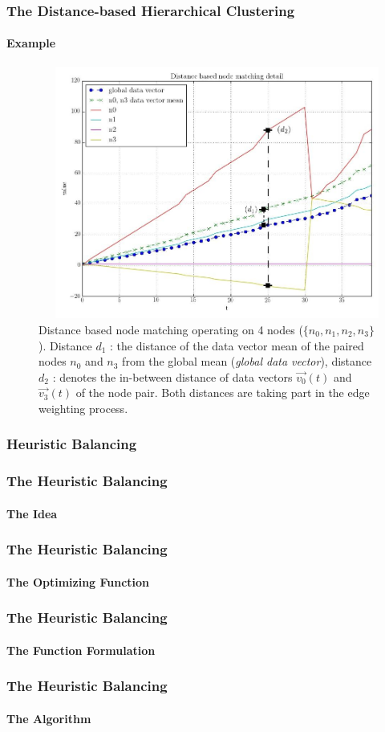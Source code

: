 \documentclass[hyperref={pdfpagelabels=false}]{beamer}
\begin{document}
\begin{frame} \frametitle{The Distance-based Hierarchical Clustering}\framesubtitle{Example}
\begin{figure}
\begin{columns}
\begin{column}[t]{0.4\linewidth}
\vspace{-5.5cm}\caption{Distance based node matching operating on 4 nodes ($\{n_0, n_1, n_2, n_3\}$). Distance $d_1$ : the distance of the data vector mean of the paired nodes $n_0$ and $n_3$ from the global mean (\emph{global data vector}), distance $d_2$ : denotes the in-between distance of data vectors $\vec{v_0}(t)$ and $\vec{v_3}(t)$ of the node pair. Both distances are taking part in the edge weighting process.} \label{fig:distoptpairdetailed}
\end{column}
\begin{column}[t]{0.6\linewidth}
\centering
\includegraphics[scale=0.22]{../img/distoptpair_example_detail_edited.jpeg}
\end{column}
\end{columns}
\end{figure}
\end{frame}
\subsubsection*{Heuristic Balancing}
\begin{frame} \frametitle{The Heuristic Balancing}\framesubtitle{The Idea}

\end{frame}
\begin{frame} \frametitle{The Heuristic Balancing}\framesubtitle{The Optimizing Function}

\end{frame}
\begin{frame} \frametitle{The Heuristic Balancing}\framesubtitle{The Function Formulation}

\end{frame}
\begin{frame} \frametitle{The Heuristic Balancing}\framesubtitle{The Algorithm}

\end{frame}
\end{document}
